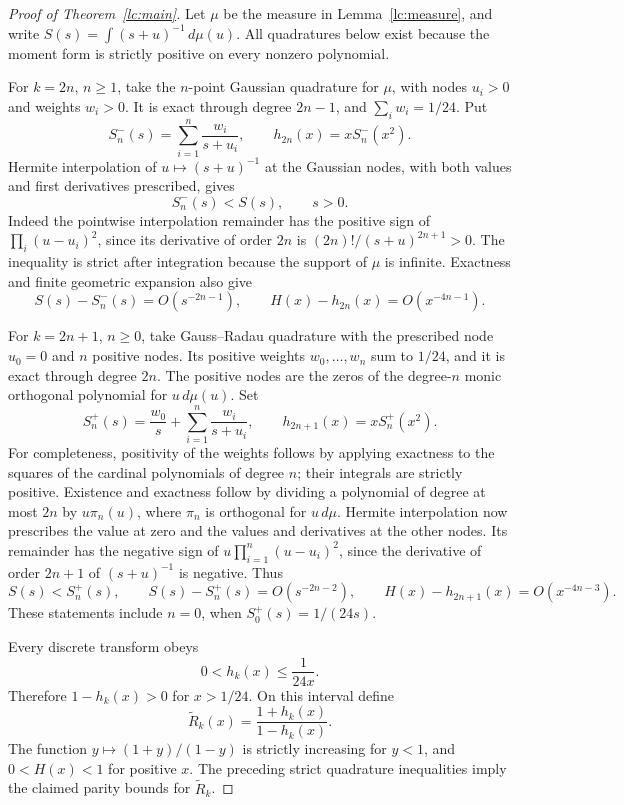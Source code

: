 \documentclass[11pt,a4paper]{article}
\theoremstyle{definition}
\theoremstyle{remark}
\numberwithin{equation}{section}
\begin{document}
\begin{proof}[Proof of Theorem~\ref{lc:main}]
Let $\mu$ be the measure in Lemma~\ref{lc:measure}, and write
$S(s)=\int(s+u)^{-1}\,d\mu(u)$. All quadratures below exist because
the moment form is strictly positive on every nonzero polynomial.

For $k=2n$, $n\ge1$, take the $n$-point Gaussian quadrature for
$\mu$, with nodes $u_i>0$ and weights $w_i>0$. It is exact through
degree $2n-1$, and $\sum_iw_i=1/24$. Put
\[
 S^-_n(s)=\sum_{i=1}^n\frac{w_i}{s+u_i},
 \qquad h_{2n}(x)=xS^-_n(x^2).
\]
Hermite interpolation of $u\mapsto(s+u)^{-1}$ at the Gaussian
nodes, with both values and first derivatives prescribed, gives
\[
 S^-_n(s)<S(s),\qquad s>0.
\]
Indeed the pointwise interpolation remainder has the positive sign
of $\prod_i(u-u_i)^2$, since its derivative of order $2n$ is
$(2n)!/(s+u)^{2n+1}>0$. The inequality is strict after integration
because the support of $\mu$ is infinite. Exactness and finite
geometric expansion also give
\[
 S(s)-S^-_n(s)=O(s^{-2n-1}),\qquad
 H(x)-h_{2n}(x)=O(x^{-4n-1}).
\]

For $k=2n+1$, $n\ge0$, take Gauss--Radau quadrature with the
prescribed node $u_0=0$ and $n$ positive nodes. Its positive weights
$w_0,\ldots,w_n$ sum to $1/24$, and it is exact through degree
$2n$. The positive nodes are the zeros of the degree-$n$ monic
orthogonal polynomial for $u\,d\mu(u)$. Set
\[
 S^+_n(s)=\frac{w_0}{s}+\sum_{i=1}^n\frac{w_i}{s+u_i},
 \qquad h_{2n+1}(x)=xS^+_n(x^2).
\]
For completeness, positivity of the weights follows by applying
exactness to the squares of the cardinal polynomials of degree
$n$; their integrals are strictly positive. Existence and exactness
follow by dividing a polynomial of degree at most $2n$ by
$u\pi_n(u)$, where $\pi_n$ is orthogonal for $u\,d\mu$.
Hermite interpolation now prescribes the value at zero and the
values and derivatives at the other nodes. Its remainder has the
negative sign of
$u\prod_{i=1}^n(u-u_i)^2$, since the derivative of order $2n+1$
of $(s+u)^{-1}$ is negative. Thus
\[
 S(s)<S^+_n(s),\qquad
 S(s)-S^+_n(s)=O(s^{-2n-2}),\qquad
 H(x)-h_{2n+1}(x)=O(x^{-4n-3}).
\]
These statements include $n=0$, when $S^+_0(s)=1/(24s)$.

Every discrete transform obeys
\[
 0<h_k(x)\le\frac1{24x}.
\]
Therefore $1-h_k(x)>0$ for $x>1/24$. On this interval define
\[
 \widetilde R_k(x)=\frac{1+h_k(x)}{1-h_k(x)}.
\]
The function $y\mapsto(1+y)/(1-y)$ is strictly increasing for
$y<1$, and $0<H(x)<1$ for positive $x$. The preceding strict
quadrature inequalities imply the claimed parity bounds for
$\widetilde R_k$.


\end{proof}
\end{document}
